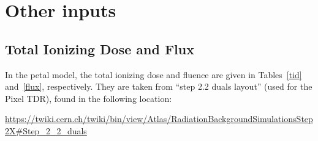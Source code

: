 
\section{Other inputs}

\subsection{Total Ionizing Dose and Flux}

In the petal model, the total ionizing dose and fluence are given in Tables~\ref{tid} and~\ref{flux},
respectively. They are taken from ``step 2.2 duals layout'' (used for the Pixel TDR), found in the following location:

{\small
\url{https://twiki.cern.ch/twiki/bin/view/Atlas/RadiationBackgroundSimulationsStep2X#Step_2_2_duals}
}

\begin{table}[ht]
\begin{centering} %
\caption{TID in 3000 fb$^{-1}$ of collected data [Rad]}
\label{tid}
\end{centering}
\end{table}



